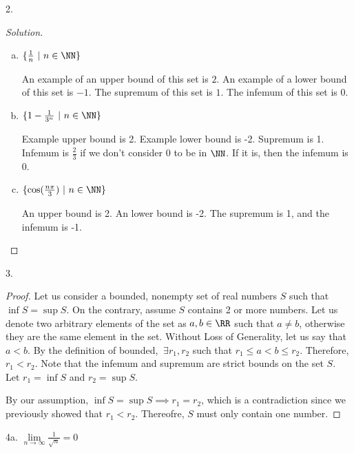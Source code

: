 \documentclass[12pt]{scrartcl}
\begin{document}
\newpage

2. 

\begin{proof}[Solution]

\hfill

\begin{enumerate}[a.]
  \item $\{\frac{1}{n} \ | \ n \in \NN\}$
  
An example of an upper bound of this set is $2$. An example of a lower bound
of this set is $-1$. The supremum of this set is $1$. 
The infemum of this set is $0$.

\item $\{1 - \frac{1}{3^n} \ | \ n \in \NN\}$

Example upper bound is 2. Example lower bound is -2.
Supremum is 1. Infemum is $\frac{2}{3}$ if we don't consider
0 to be in $\NN$. If it is, then the infemum is $0$. 


\item $\{\cos(\frac{n\pi}{3}) \ | \ n \in \NN\}$

An upper bound is 2. An lower bound is -2. 
The supremum is 1, and the infemum is -1. 
\end{enumerate}

\end{proof}

\newpage

3. 

\begin{proof}

Let us consider a bounded, nonempty set of real numbers $S$ such that 
$\inf S = \sup S$. On the contrary, assume $S$ contains 2 or more numbers. 
Let us denote two arbitrary elements of the set as 
$a, b \in \RR$ such that $a \neq b$, otherwise they are the same element in the set. 
Without Loss of Generality, let us say that $a < b$. By the definition of bounded, 
$\ \exists r_1, r_2$ such that $r_1 \leq a < b \leq r_2$. Therefore, 
$r_1 < r_2$. Note that the infemum and 
supremum are strict bounds on the set $S$. Let $r_1 = \inf S$ and $r_2 = \sup S$. 

By our assumption, $\inf S = \sup S \implies r_1 = r_2$, which is a contradiction since we previously 
showed that $r_1 < r_2$. Thereofre, $S$ must only contain one number. 

\end{proof}

\newpage

4a. $\underset{n\to\infty}{\lim}\frac{1}{\sqrt{n}} = 0$
\end{document}
